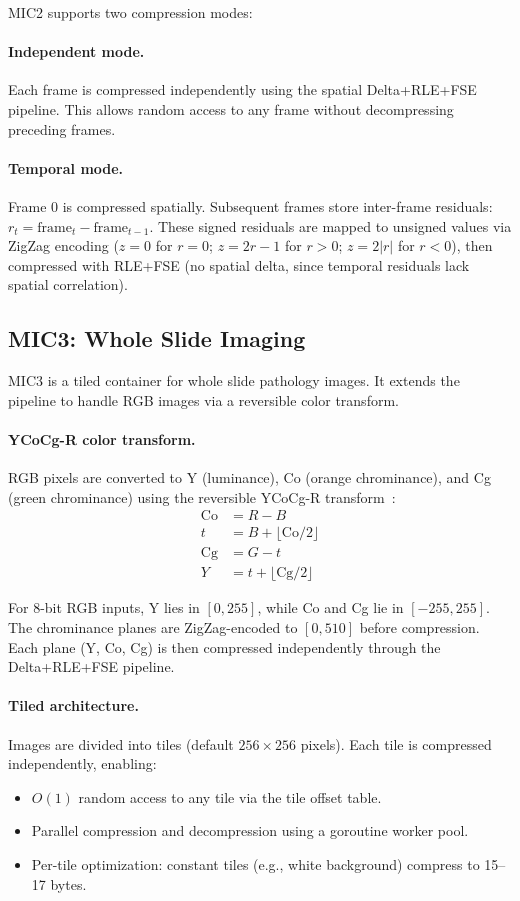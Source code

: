 \documentclass[11pt,twocolumn]{article}
\begin{document}
MIC2 supports two compression modes:

\paragraph{Independent mode.}
Each frame is compressed independently using the spatial Delta+RLE+FSE pipeline.
This allows random access to any frame without decompressing preceding frames.

\paragraph{Temporal mode.}
Frame 0 is compressed spatially.
Subsequent frames store inter-frame residuals: $r_t = \text{frame}_t - \text{frame}_{t-1}$.
These signed residuals are mapped to unsigned values via ZigZag encoding ($z = 0$ for $r = 0$; $z = 2r - 1$ for $r > 0$; $z = 2|r|$ for $r < 0$), then compressed with RLE+FSE (no spatial delta, since temporal residuals lack spatial correlation).

\subsection{MIC3: Whole Slide Imaging}

MIC3 is a tiled container for whole slide pathology images.
It extends the pipeline to handle RGB images via a reversible color transform.

\paragraph{YCoCg-R color transform.}
RGB pixels are converted to Y (luminance), Co (orange chrominance), and Cg (green chrominance) using the reversible YCoCg-R transform~\cite{malvar2003}:
\begin{align}
    \text{Co} &= R - B \\
    t &= B + \lfloor \text{Co}/2 \rfloor \\
    \text{Cg} &= G - t \\
    Y &= t + \lfloor \text{Cg}/2 \rfloor
\end{align}

For 8-bit RGB inputs, Y lies in $[0, 255]$, while Co and Cg lie in $[-255, 255]$.
The chrominance planes are ZigZag-encoded to $[0, 510]$ before compression.
Each plane (Y, Co, Cg) is then compressed independently through the Delta+RLE+FSE pipeline.

\paragraph{Tiled architecture.}
Images are divided into tiles (default $256\times256$ pixels).
Each tile is compressed independently, enabling:
\begin{itemize}[nosep]
    \item $O(1)$ random access to any tile via the tile offset table.
    \item Parallel compression and decompression using a goroutine worker pool.
    \item Per-tile optimization: constant tiles (e.g., white background) compress to 15--17 bytes.
\end{itemize}
\end{document}
